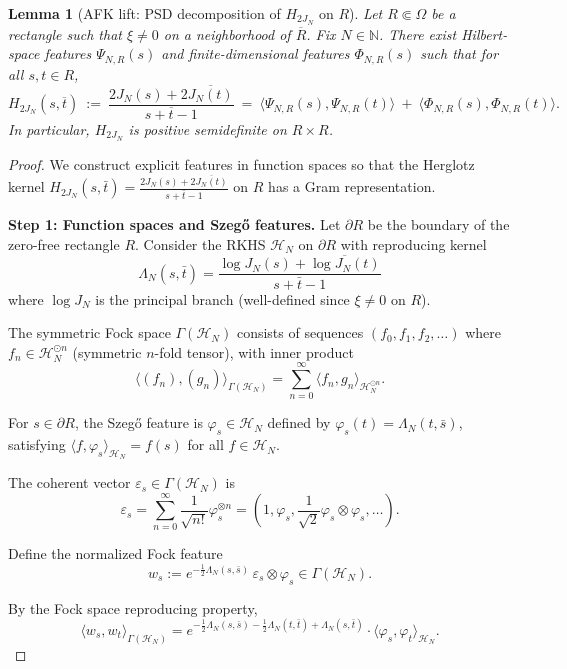 \documentclass[11pt]{article}
\newtheorem{lemma}[theorem]{Lemma}
\theoremstyle{remark}
\begin{document}
\begin{lemma}[AFK lift: PSD decomposition of \(H_{2J_N}\) on \(R\)]\label{lem:AFK}
Let \(R\Subset\Omega\) be a rectangle such that \(\xi\neq 0\) on a neighborhood of \(\overline R\). Fix \(N\in\mathbb N\). There exist Hilbert-space features \(\Psi_{N,R}(s)\) and finite-dimensional features \(\Phi_{N,R}(s)\) such that for all \(s,t\in R\),
\[
 H_{2J_N}(s,\overline t)\ :=\ \frac{2J_N(s)+2\overline{J_N(t)}}{s+\overline t-1}\ =\ \big\langle\Psi_{N,R}(s),\Psi_{N,R}(t)\big\rangle\ +\ \big\langle\Phi_{N,R}(s),\Phi_{N,R}(t)\big\rangle.
\]
In particular, \(H_{2J_N}\) is positive semidefinite on \(R\times R\).
\end{lemma}
\begin{proof}
We construct explicit features in function spaces so that the Herglotz kernel
$H_{2J_N}(s,\bar t) = \frac{2J_N(s) + 2\overline{J_N(t)}}{s + \bar t - 1}$
on $R$ has a Gram representation.

\medskip
\noindent\textbf{Step 1: Function spaces and Szegő features.}
Let $\partial R$ be the boundary of the zero-free rectangle $R$. Consider the RKHS $\mathcal{H}_N$ on $\partial R$ with reproducing kernel
\[
  \Lambda_N(s,\bar t) = \frac{\log J_N(s) + \overline{\log J_N(t)}}{s + \bar t - 1}
\]
where $\log J_N$ is the principal branch (well-defined since $\xi \neq 0$ on $R$).

The symmetric Fock space $\Gamma(\mathcal{H}_N)$ consists of sequences $(f_0, f_1, f_2, \ldots)$ where $f_n \in \mathcal{H}_N^{\odot n}$ (symmetric $n$-fold tensor), with inner product
\[
  \langle (f_n), (g_n) \rangle_{\Gamma(\mathcal{H}_N)} = \sum_{n=0}^\infty \langle f_n, g_n \rangle_{\mathcal{H}_N^{\odot n}}.
\]

For $s \in \partial R$, the Szegő feature is $\varphi_s \in \mathcal{H}_N$ defined by $\varphi_s(t) = \Lambda_N(t,\bar s)$, satisfying $\langle f, \varphi_s \rangle_{\mathcal{H}_N} = f(s)$ for all $f \in \mathcal{H}_N$.

The coherent vector $\varepsilon_s \in \Gamma(\mathcal{H}_N)$ is
\[
  \varepsilon_s = \sum_{n=0}^\infty \frac{1}{\sqrt{n!}} \varphi_s^{\otimes n} = (1, \varphi_s, \frac{1}{\sqrt{2}} \varphi_s \otimes \varphi_s, \ldots).
\]

Define the normalized Fock feature
\[
  w_s := e^{-\frac{1}{2}\Lambda_N(s,\bar s)} \, \varepsilon_s \otimes \varphi_s \in \Gamma(\mathcal{H}_N).
\]

By the Fock space reproducing property,
\[
  \langle w_s, w_t \rangle_{\Gamma(\mathcal{H}_N)} = e^{-\frac{1}{2}\Lambda_N(s,\bar s) - \frac{1}{2}\Lambda_N(t,\bar t) + \Lambda_N(s,\bar t)} \cdot \langle \varphi_s, \varphi_t \rangle_{\mathcal{H}_N}.
\]


\end{proof}
\end{document}

